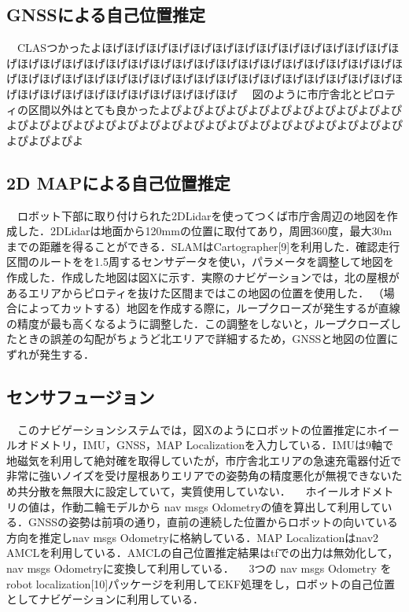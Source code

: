 \documentclass[platex,dvipdfmx]{rbproceedings}
\begin{document}
\subsection{GNSSによる自己位置推定}
　CLASつかったよほげほげほげほげほげほげほげほげほげほげほげほげほげほげほげほげほげほげほげほげほげほげほげほげほげほげほげほげほげほげほげほげほげほげほげほげほげほげほげほげほげほげほげほげほげほげほげほげほげほげほげほげほげほげほげほげほげほげほげほげ
　図のように市庁舎北とピロティの区間以外はとても良かったよぴよぴよぴよぴよぴよぴよぴよぴよぴよぴよぴよぴよぴよぴよぴよぴよぴよぴよぴよぴよぴよぴよぴよぴよぴよぴよぴよぴよぴよぴよぴよぴよ

\subsection{2D MAPによる自己位置推定}
　ロボット下部に取り付けられた2DLidarを使ってつくば市庁舎周辺の地図を作成した．2DLidarは地面から120mmの位置に取付てあり，周囲360度，最大30mまでの距離を得ることができる．SLAMはCartographer[9]を利用した．確認走行区間のルートをを1.5周するセンサデータを使い，パラメータを調整して地図を作成した．作成した地図は図Xに示す．実際のナビゲーションでは，北の屋根があるエリアからピロティを抜けた区間まではこの地図の位置を使用した．
（場合によってカットする）地図を作成する際に，ループクローズが発生するが直線の精度が最も高くなるように調整した．この調整をしないと，ループクローズしたときの誤差の勾配がちょうど北エリアで詳細するため，GNSSと地図の位置にずれが発生する．

\subsection{センサフュージョン}
　このナビゲーションシステムでは，図Xのようにロボットの位置推定にホイールオドメトリ，IMU，GNSS，MAP Localizationを入力している．IMUは9軸で地磁気を利用して絶対確を取得していたが，市庁舎北エリアの急速充電器付近で非常に強いノイズを受け屋根ありエリアでの姿勢角の精度悪化が無視できないため共分散を無限大に設定していて，実質使用していない．
　ホイールオドメトリの値は，作動二輪モデルから nav msgs Odometryの値を算出して利用している．GNSSの姿勢は前項の通り，直前の連続した位置からロボットの向いている方向を推定しnav msgs Odometryに格納している．MAP Localizationはnav2 AMCLを利用している．AMCLの自己位置推定結果はtfでの出力は無効化して，nav msgs Odometryに変換して利用している．
　3つの nav msgs Odometry をrobot localization[10]パッケージを利用してEKF処理をし，ロボットの自己位置としてナビゲーションに利用している．
\end{document}

